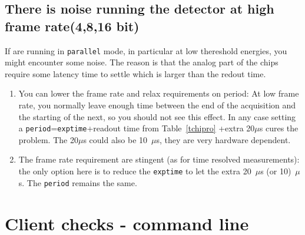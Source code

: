 \documentclass{article}
\begin{document}
\subsection{There is noise running the detector at high frame rate(4,8,16 bit)}
If are running in {\tt{parallel}} mode, in particular at low thereshold energies, you might encounter some noise. The reason is that the analog part of the chips require some latency time to settle which is larger than the redout time. 
\begin{enumerate}
\item You can lower the frame rate and relax requirements on period: 
At low frame rate, you normally leave enough time between the end of the acquisition and the starting of the next, so you should not see this effect. In any case setting a {\tt{period}}={\tt{exptime}}+readout time from Table~\ref{tchipro} +extra 20$\mu$s cures the problem. The 20$\mu$s could also be 10~$\mu$s, they are very hardware dependent.
\item The frame rate requirement are stingent (as for time resolved measurements): the only option here is to reduce the {\tt{exptime}} to let the extra 20~$\mu$s (or 10)~$\mu$s. The {\tt{period}} remains the same.
\end{enumerate} 
 
\section{Client checks - command line}
\end{document}
